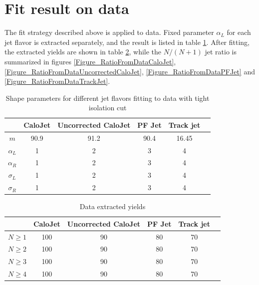 \documentclass[10pt,a4paper,onecolumn]{article}
\begin{document}
\section{Fit result on data}

The fit strategy described above is applied to data.  Fixed parameter $\alpha_L$ for each jet flavor is extracted separately, and the result is listed in table \ref{Table_DataAlphaL}.
After fitting, the extracted yields are shown in table \ref{Table_DataExtractedYields}, while the $N/(N+1)$ jet ratio is summarized in figures \ref{Figure_RatioFromDataCaloJet},
\ref{Figure_RatioFromDataUncorrectedCaloJet}, \ref{Figure_RatioFromDataPFJet} and \ref{Figure_RatioFromDataTrackJet}.

\begin{table}
   \caption{Shape parameters for different jet flavors fitting to data with tight isolation cut}
   \centering
   \begin{tabular}{|c|c|c|c|c|c|}
      \hline
       & CaloJet & Uncorrected CaloJet & PF Jet & Track jet \\\hline
      $m$ & 90.9 & 91.2 & 90.4 & 16.45 \\\hline
      $\alpha_L$ & 1 & 2 & 3 & 4 \\\hline
      $\alpha_R$ & 1 & 2 & 3 & 4 \\\hline
      $\sigma_L$ & 1 & 2 & 3 & 4 \\\hline
      $\sigma_R$ & 1 & 2 & 3 & 4 \\\hline
   \end{tabular}
   \label{Table_DataAlphaL}
\end{table}

\begin{table}
   \caption{Data extracted yields}
   \centering
   \begin{tabular}{|c|c|c|c|c|c|}
      \hline
       & CaloJet & Uncorrected CaloJet & PF Jet & Track jet \\\hline
      $N \ge 1$ & 100 & 90 & 80 & 70 \\\hline
      $N \ge 2$ & 100 & 90 & 80 & 70 \\\hline
      $N \ge 3$ & 100 & 90 & 80 & 70 \\\hline
      $N \ge 4$ & 100 & 90 & 80 & 70 \\\hline
   \end{tabular}
   \label{Table_DataExtractedYields}
\end{table}
\end{document}
